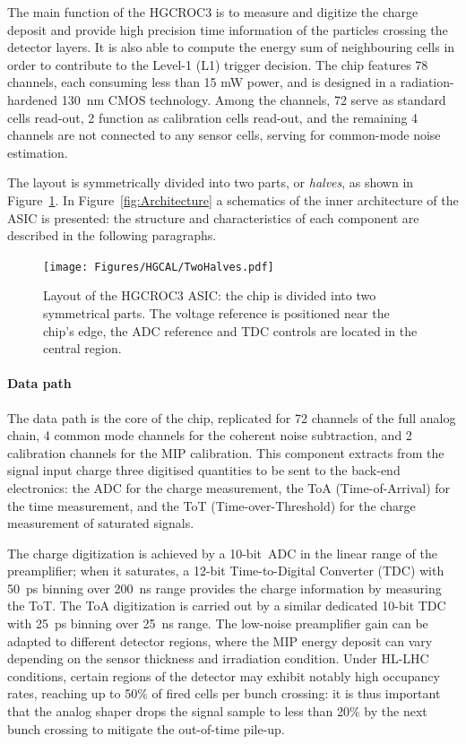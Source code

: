 \bigbreak

The main function of the HGCROC3 is to measure and digitize the charge deposit and provide high precision time information of the particles crossing the detector layers. It is also able to compute the energy sum of neighbouring cells in order to contribute to the Level-1 (L1) trigger decision. 
The chip features 78 channels, each consuming less than 15 mW power, and is designed in a radiation-hardened 130~nm CMOS technology. Among the channels, 72 serve as standard cells read-out, 2 function as calibration cells read-out, and the remaining 4 channels are not connected to any sensor cells, serving for common-mode noise estimation. 

The layout is symmetrically divided into two parts, or \textit{halves}, as shown in Figure~\ref{fig:TowHalves}.
In Figure~\ref{fig:Architecture} a schematics of the inner architecture of the ASIC is presented: the structure and characteristics of each component are described in the following paragraphs.

\begin{figure}
    \centering
    \texttt{[image: Figures/HGCAL/TwoHalves.pdf]}
    \caption{Layout of the HGCROC3 ASIC: the chip is divided into two symmetrical parts. The voltage reference is positioned near the chip's edge, the ADC reference and TDC controls are located in the central region.}
    \label{fig:TowHalves}
\end{figure}

\paragraph{Data path}
The data path is the core of the chip, replicated for 72 channels of the full analog chain, 4 common mode channels for the coherent noise subtraction, and 2 calibration channels for the MIP calibration. This component extracts from the signal input charge three digitised quantities to be sent to the back-end electronics: the ADC for the charge measurement, the ToA (Time-of-Arrival) for the time measurement, and the ToT (Time-over-Threshold) for the charge measurement of saturated signals. 

The charge digitization is achieved by a 10-bit~ADC in the linear range of the preamplifier; when it saturates, a 12-bit Time-to-Digital Converter (TDC) with 50~ps binning over 200~ns range provides the charge information by measuring the ToT. The ToA digitization is carried out by a similar dedicated 10-bit TDC with 25~ps binning over 25~ns range.
The low-noise preamplifier gain can be adapted to different detector regions, where the MIP energy deposit can vary depending on the sensor thickness and irradiation condition.
Under HL-LHC conditions, certain regions of the detector may exhibit notably high occupancy rates, reaching up to 50$\%$ of fired cells per bunch crossing: it is thus important that the analog shaper drops the signal sample to less than 20$\%$ by the next bunch crossing to mitigate the out-of-time pile-up.

